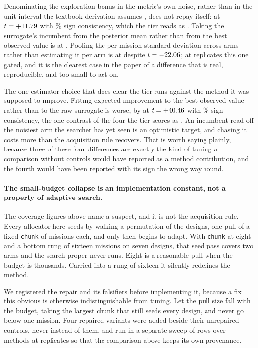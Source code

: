 \documentclass[11pt]{article}
\begin{document}
Denominating the exploration bonus in the metric's own noise, rather than in the unit interval the
textbook derivation assumes \citep{auer2002finite}, does not repay itself: \RsDiscScaleEff{} at $t = +11.79{}$ with
\RsDiscScaleSign{}\% sign consistency, which the tier reads as \RsDiscScaleVerdict{}. Taking the
surrogate's incumbent from the posterior mean rather than from the best observed value is
\RsDiscIncVerdict{} at \RsDiscIncEff{}. Pooling the per-mission standard deviation across arms
rather than estimating it per arm is \RsDiscVarVerdict{} at \RsDiscVarEff{} despite $t =
-22.06{}$; at \RsPrevReplicates{}
replicates this one gated, and it is the clearest case in the paper of a difference that is real,
reproducible, and too small to act on.

The one estimator choice that does clear the tier runs against the method it was supposed to
improve. Fitting expected improvement to the best observed value rather than to the raw surrogate
is worse, by \RsDiscPriorEff{} at $t = +40.46{}$ with \RsDiscPriorSign{}\% sign
consistency, the one contrast of the four the tier scores as \RsDiscPriorVerdict{}. An incumbent read off the noisiest arm the searcher has yet seen is an
optimistic target, and chasing it costs more than the acquisition rule recovers. That is worth
saying plainly, because three of these four differences are exactly the kind of tuning a comparison
without controls would have reported as a method contribution, and the fourth would have been
reported with its sign the wrong way round.

\paragraph{The small-budget collapse is an implementation constant, not a property of adaptive
search.} The coverage figures above name a suspect, and it is not the acquisition rule. Every
allocator here seeds by walking a permutation of the designs, one pull of a fixed \texttt{chunk} of
missions each, and only then begins to adapt. With \texttt{chunk} at eight and a bottom rung of
sixteen missions on seven designs, that seed pass covers two arms and the search proper never runs.
Eight is a reasonable pull when the budget is thousands. Carried into a rung of sixteen it silently
redefines the method.

We registered the repair and its falsifiers before implementing it, because a fix this obvious is
otherwise indistinguishable from tuning. Let the pull size fall with the budget, taking the largest
chunk that still seeds every design, and never go below one mission. Four repaired variants were
added beside their unrepaired controls, never instead of them, and run in a separate sweep of
\WmRows{} rows over \WmMethods{} methods at \WmReplicates{} replicates so that the comparison above
keeps its own provenance.
\end{document}
